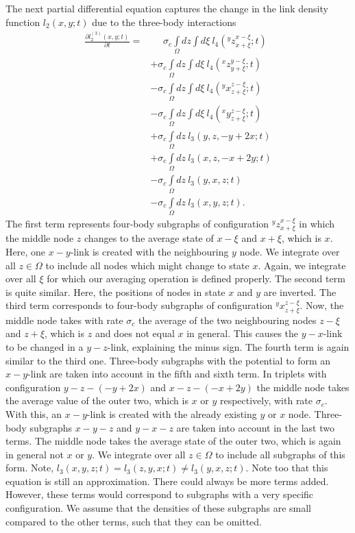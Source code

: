 The next partial differential equation captures the change in the link density function $l_2(x,y;t)$ due to the three-body interactions 
\begin{equation}
\begin{aligned}
\frac{\partial l^{(3)}_2(x,y;t)}{\partial t} 
=& \phantom{+..}
   \sigma_c \int\limits_{\Omega} dz \int d\xi\ l_4(^y z^{x-\xi }_{x+\xi };t) \\
&+ \sigma_c \int\limits_{\Omega} dz \int d\xi\ l_4(^x z^{y-\xi }_{y+\xi };t)  \\
&- \sigma_c \int\limits_{\Omega} dz \int d\xi\ l_4(^y x^{z-\xi}_{z+\xi};t) \\
&- \sigma_c \int\limits_{\Omega} dz \int d\xi\ l_4(^x y^{z-\xi}_{z+\xi};t) \\
&+ \sigma_c \int\limits_{\Omega} dz\ l_3(y,z,-y+2x;t) \\
&+ \sigma_c \int\limits_{\Omega} dz\ l_3(x,z,-x+2y;t) \\
&- \sigma_c \int\limits_{\Omega} dz\ l_3(y,x,z;t) \\ 
&- \sigma_c \int\limits_{\Omega} dz\ l_3(x,y,z;t) 
.
\label{eq:continuous_pde_link_secondtype}
\end{aligned}
\end{equation}
The first term represents four-body subgraphs of configuration $^y z^{x-\xi }_{x+\xi }$ in which the middle node $z$ changes to the average state of $x-\xi $ and $x+\xi $, which is $x$. Here, one $x-y$-link is created with the neighbouring $y$ node. We integrate over all $z \in\Omega$ to include all nodes which might change to state $x$. Again, we integrate over all $\xi $ for which our averaging operation is defined properly. The second term is quite similar. Here, the positions of nodes in state $x$ and $y$ are inverted. 
The third term corresponds to four-body subgraphs of configuration $^y x^{z-\xi }_{z+\xi }$. Now, the middle node takes with rate $\sigma_c$ the average of the two neighbouring nodes $z-\xi$ and $z+\xi$, which is $z$ and does not equal $x$ in general. This causes the $y-x$-link to be changed in a $y-z$-link, explaining the minus sign. The fourth term is again similar to the third one.
Three-body subgraphs with the potential to form an $x-y$-link are taken into account in the fifth and sixth term. In triplets with configuration $y-z-(-y+2x)$ and $x-z-(-x+2y)$ the middle node takes the average value of the outer two, which is $x$ or $y$ respectively, with rate $\sigma_c$. With this, an $x-y$-link is created with the already existing $y$ or $x$ node.
Three-body subgraphs $x-y-z$ and $y-x-z$ are taken into account in the last two terms. The middle node takes the average state of the outer two, which is again in general not $x$ or $y$. We integrate over all $z\in\Omega$ to include all subgraphs of this form. Note, $l_3(x,y,z;t)=l_3(z,y,x;t) \ne l_3(y,x,z;t)$. Note too that this equation is still an approximation. There could always be more terms added. However, these terms would correspond to subgraphs with a very specific configuration. We assume that the densities of these subgraphs are small compared to the other terms, such that they can be omitted.


